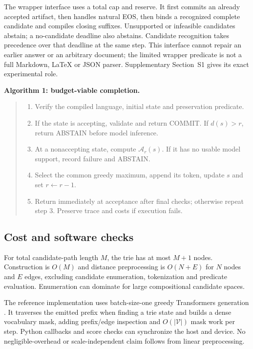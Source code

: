 \documentclass[12pt,a4paper]{article}
\begin{document}
The wrapper interface uses a total cap and reserve. It first commits an already accepted artifact, then handles natural EOS, then binds a recognized complete candidate and compiles closing suffixes. Unsupported or infeasible candidates abstain; a no-candidate deadline also abstains. Candidate recognition takes precedence over that deadline at the same step. This interface cannot repair an earlier answer or an arbitrary document; the limited wrapper predicate is not a full Markdown, LaTeX or JSON parser. Supplementary Section~S1 gives its exact experimental role.

\noindent\textbf{Algorithm 1: budget-viable completion.}
\begin{quote}\small\singlespacing
\begin{enumerate}
\item Verify the compiled language, initial state and preservation predicate.
\item If the state is accepting, validate and return COMMIT. If $d(s)>r$, return ABSTAIN before model inference.
\item At a nonaccepting state, compute $\mathcal A_r(s)$. If it has no usable model support, record failure and ABSTAIN.
\item Select the common greedy maximum, append its token, update $s$ and set $r\leftarrow r-1$.
\item Return immediately at acceptance after final checks; otherwise repeat step 3. Preserve trace and costs if execution fails.
\end{enumerate}
\end{quote}

\subsection{Cost and software checks}
For total candidate-path length $M$, the trie has at most $M+1$ nodes. Construction is $O(M)$ and distance preprocessing is $O(N+E)$ for $N$ nodes and $E$ edges, excluding candidate enumeration, tokenization and predicate evaluation. Enumeration can dominate for large compositional candidate spaces.

The reference implementation uses batch-size-one greedy Transformers generation \citep{transformers2025}. It traverses the emitted prefix when finding a trie state and builds a dense vocabulary mask, adding prefix/edge inspection and $O(|\mathcal V|)$ mask work per step. Python callbacks and score checks can synchronize the host and device. No negligible-overhead or scale-independent claim follows from linear preprocessing.
\end{document}
